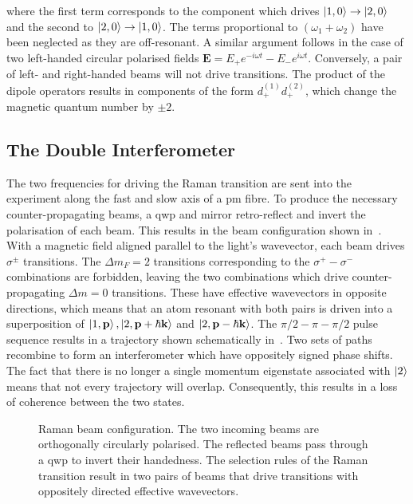 where the first term corresponds to the component which drives
$\ket{1,0} \rightarrow \ket{2,0}$ and the second to $\ket{2,0}
\rightarrow \ket{1,0}$.
The terms proportional
to $(\omega_1 + \omega_2)$ have been neglected as they are
off-resonant. A similar argument follows in the case of two left-handed
circular polarised fields $\textbf{E} = E_+ e^{-i \omega t} - E_-
e^{i \omega t}$. Conversely, a pair of left- and right-handed beams
will not drive transitions. The product of the dipole operators
results in components of the form $d^{(1)}_+ d^{(2)}_+$, which
change the magnetic quantum number by $\pm2$.
\subsection{The Double Interferometer}\label{sec:theory_double_int}
The two frequencies for driving the Raman transition are sent into the
experiment along the fast and slow axis of a \ac{pm} fibre. 
To produce the necessary counter-propagating beams, a \ac{qwp} and
mirror retro-reflect and invert the polarisation of each beam. This
results in the beam configuration shown in~.
With a magnetic field aligned parallel to the light's wavevector, each
beam drives $\sigma^\pm$ transitions. The $\Delta m_F = 2$ transitions
corresponding to the $\sigma^+ - \sigma^-$ combinations are forbidden,
leaving the two combinations which drive counter-propagating $\Delta m
= 0$ transitions. These have effective wavevectors in opposite
directions, which means that an atom resonant with both pairs is
driven into a superposition of $\ket{1,\textbf{p}},
  \ket{2,\textbf{p}+\hbar \textbf{k}}$ and  $\ket{2,\textbf{p}-\hbar
  \textbf{k}}$. The $\pi/2-\pi-\pi/2$ pulse sequence results in a trajectory shown schematically
  in~. Two sets of paths recombine to
  form an interferometer which have oppositely signed phase shifts.
  The fact that there is no longer a single momentum eigenstate
  associated with $\ket{2}$ means that not every trajectory will
  overlap. Consequently, this results in a loss of coherence between
  the two states. 
\begin{figure}[htpb]
  \centering
  \resizebox{0.8\textwidth}{!}{}
  \caption[Raman beam configuration.]{Raman beam configuration. The two incoming beams are
  orthogonally circularly polarised. The reflected beams pass through
a \ac{qwp} to invert their handedness. The selection rules of the
Raman transition result in two pairs of beams that drive transitions
with oppositely directed effective wavevectors.}
  \label{fig:double_int}
\end{figure}
